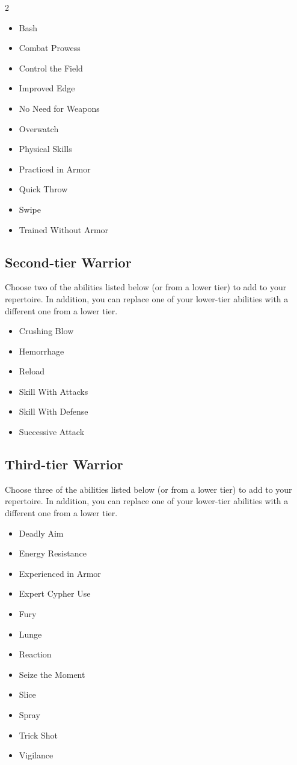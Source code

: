 \begin{multicols}{2}
\begin{itemize}
\item Bash
\item Combat Prowess
\item Control the Field
\item Improved Edge
\item No Need for Weapons
\item Overwatch
\item Physical Skills
\item Practiced in Armor
\item Quick Throw
\item Swipe
\item Trained Without Armor
\end{itemize}

\subsection{Second-tier Warrior}

Choose two of the abilities listed below (or from a lower tier) to add to your repertoire. In addition, you can replace one of your lower-tier abilities with a different one from a lower tier.

\begin{itemize}
\item Crushing Blow
\item Hemorrhage
\item Reload
\item Skill With Attacks
\item Skill With Defense
\item Successive Attack
\end{itemize}


\subsection{Third-tier Warrior}

Choose three of the abilities listed below (or from a lower tier) to add to your repertoire. In addition, you can replace one of your lower-tier abilities with a different one from a lower tier.

\begin{itemize}
\item Deadly Aim
\item Energy Resistance
\item Experienced in Armor
\item Expert Cypher Use
\item Fury
\item Lunge
\item Reaction
\item Seize the Moment
\item Slice
\item Spray
\item Trick Shot
\item Vigilance
\end{itemize}


\end{multicols}
